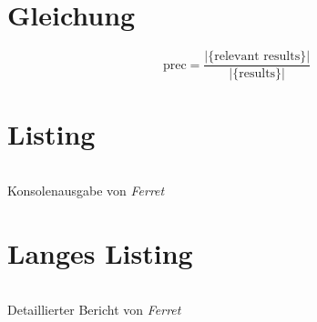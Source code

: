 \section{Gleichung}
\begin{equation}\label{eqn:prec}
    \mbox{prec}=\frac{|\{\mbox{relevant results}\}|}{|\{\mbox{results}\}|}
\end{equation}

\section{Listing}
\begin{listing}
    \inputminted{bat}{lst/ferret.txt}
    \caption{Konsolenausgabe von \emph{Ferret}}\label{lst:ferret}
\end{listing}

\section{Langes Listing}
\begin{longlisting}
    \inputminted{xml}{lst/ferret.xml}
    \caption{Detaillierter Bericht von \emph{Ferret}}\label{lst:ferretXml}
\end{longlisting}